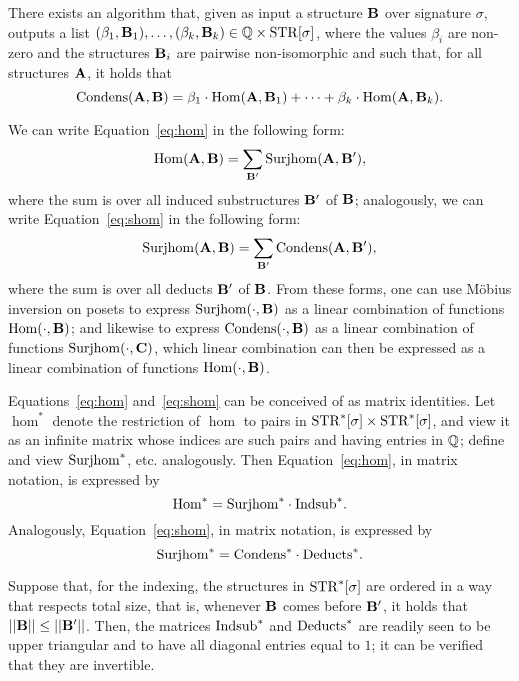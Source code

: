 \documentclass[11pt]{article}
\begin{document}
\begin{prop}
\label{prop:condens}
There exists an algorithm that,
given as input a structure $\mathbf{B}$ over signature $\sigma$,
outputs a list 
$(\beta_1,\mathbf{B}_1),\ldots,(\beta_k,\mathbf{B}_k) \in \mathbb{Q} \times \mathrm{STR}[\sigma]$,
where the 
values $\beta_i$ are non-zero
and the structures
$\mathbf{B}_i$ are pairwise non-isomorphic and
such that, for all structures $\mathbf{A}$, it holds that
$$\mathrm{Condens}(\mathbf{A},\mathbf{B}) = 
\beta_1 \cdot \mathrm{Hom}(\mathbf{A},\mathbf{B}_1)
+ \cdots + 
\beta_k \cdot \mathrm{Hom}(\mathbf{A},\mathbf{B}_k).$$
\end{prop}

\begin{remark}
We can write
Equation~\ref{eq:hom} 
in the following form:
$$\mathrm{Hom}(\mathbf{A},\mathbf{B}) = \sum_{\mathbf{B}'} \mathrm{Surjhom}(\mathbf{A},\mathbf{B}'),$$
where the sum is over all induced substructures $\mathbf{B}'$ of $\mathbf{B}$;
analogously, we can write
Equation~\ref{eq:shom} 
in the following form:
$$\mathrm{Surjhom}(\mathbf{A},\mathbf{B}) = \sum_{\mathbf{B}'} \mathrm{Condens}(\mathbf{A},\mathbf{B}'),$$
where the sum is over all deducts $\mathbf{B}'$ of $\mathbf{B}$.
From these forms, one can use M\"obius inversion on posets
to express $\mathrm{Surjhom}(\cdot, \mathbf{B})$ as a linear combination
of functions $\mathrm{Hom}(\cdot, \mathbf{B})$;
and likewise to express $\mathrm{Condens}(\cdot,\mathbf{B})$
as a linear combination of functions $\mathrm{Surjhom}(\cdot,\mathbf{C})$,
which linear combination can then be expressed as a linear combination of 
functions $\mathrm{Hom}(\cdot,\mathbf{B})$.
\end{remark}

\begin{remark}
Equations~\ref{eq:hom} and~\ref{eq:shom}
can be conceived of as matrix identities.
Let $\hom^*$ denote the restriction of $\hom$
to pairs in $\mathrm{STR}^*[\sigma] \times \mathrm{STR}^*[\sigma]$,
and view it as an infinite matrix whose indices are such pairs
and having entries in $\mathbb{Q}$;
define and view $\mathrm{Surjhom}^*$, etc. analogously.
Then Equation~\ref{eq:hom}, in matrix notation, is expressed by
$$\mathrm{Hom}^* = \mathrm{Surjhom}^* \cdot \mathrm{Indsub}^*.$$
Analogously, Equation~\ref{eq:shom}, in matrix notation,
is expressed by
$$\mathrm{Surjhom}^* = \mathrm{Condens}^* \cdot \mathrm{Deducts}^*.$$

Suppose that, for the indexing,
the structures in $\mathrm{STR}^*[\sigma]$ 
are ordered in a way that respects total size,
that is, whenever $\mathbf{B}$ comes before $\mathbf{B}'$,
it holds that $||\mathbf{B}|| \leq ||\mathbf{B}'||$.
Then, the matrices $\mathrm{Indsub}^*$ and $\mathrm{Deducts}^*$
are readily seen to be upper triangular and 
to have all diagonal entries equal to $1$;
it can be verified that they are invertible.
\end{remark}
\end{document}
